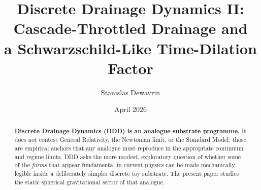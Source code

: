\documentclass[11pt,a4paper]{article}
\title{\textbf{Discrete Drainage Dynamics II:\\
Cascade-Throttled Drainage and\\
a Schwarzschild-Like Time-Dilation Factor}}
\author[1]{Stanislas Dewavrin}
\affil[1]{Independent researcher \\ \texttt{dewavrin.iphone@gmail.com}}
\date{April 2026}
\begin{document}
\maketitle

\begin{abstract}
\noindent
\textbf{Discrete Drainage Dynamics (DDD) is an analogue-substrate
programme.} It does not contest General Relativity, the
Newtonian limit, or the Standard Model: those are empirical
anchors that any analogue must reproduce in the appropriate
continuum and regime limits. DDD asks the more modest,
exploratory question of whether some of the \emph{forms} that
appear fundamental in current physics can be made mechanically
legible inside a deliberately simpler discrete toy substrate.
The present paper studies the static spherical gravitational
sector of that analogue.


\end{abstract}
\end{document}
